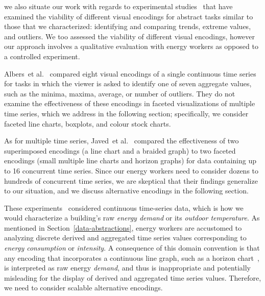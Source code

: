 \documentclass[journal]{vgtc}                %
\newcommand{\bstart}[1]{\vspace{1mm} \noindent{\textbf{#1:}}}
\newcommand{\tm}[1]{\textcolor{red}{#1}}
\newcommand{\etal}{et al.}
\begin{document}
\bstart{Evaluating visualizations of time-oriented data} we also situate our work with regards to experimental studies~\cite{Albers2014,Fuchs2013,Javed2010} that have examined the viability of different visual encodings for abstract tasks similar to those that we characterized: identifying and comparing trends, extreme values, and outliers.
We too assessed the viability of different visual encodings, however our approach involves a qualitative evaluation with energy workers as opposed to a controlled experiment.

Albers~\etal~\cite{Albers2014} compared eight visual encodings of a single continuous time series for tasks in which the viewer is asked to identify one of seven aggregate values, such as the minima, maxima, average, or number of outliers. 
They do not examine the effectiveness of these encodings in faceted visualizations of multiple time series, which we address in the following section; specifically, we consider faceted line charts, boxplots, and colour stock charts.

As for multiple time series, Javed~\etal~\cite{Javed2010} compared the effectiveness of two superimposed encodings (a line chart and a braided graph) to two faceted encodings (small multiple line charts and horizon graphs) for data containing up to 16 concurrent time series.
Since our energy workers need to consider dozens to hundreds of concurrent time series, we are skeptical that their findings generalize to our situation, and we discuss alternative encodings in the following section. 

These experiments~\cite{Albers2014,Fuchs2013,Javed2010} considered continuous time-series data, which is how we would characterize a building's raw {\it energy demand} or its {\it outdoor temperature}. 
As mentioned in Section~\ref{data-abstractions}, energy workers are accustomed to analyzing discrete derived and aggregated time series values corresponding to {\it energy consumption} or {\it intensity}.
A consequence of this domain convention is that any encoding that incorporates a continuous line graph, such as a horizon chart~\cite{Heer2009}, is interpreted as raw energy {\it demand}, and thus is inappropriate and potentially misleading for the display of derived and aggregated time series values. 
Therefore, we need to consider scalable alternative encodings.
\end{document}
